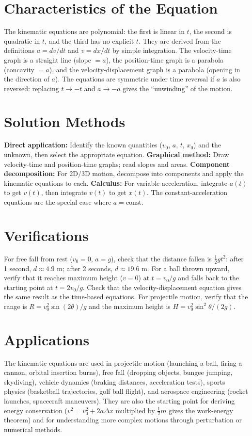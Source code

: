 \documentclass[11pt,openright]{book}
\begin{document}
\section*{Characteristics of the Equation}

The kinematic equations are polynomial: the first is linear in $t$, the second is quadratic in $t$, and the third has no explicit $t$. They are derived from the definitions $a = dv/dt$ and $v = dx/dt$ by simple integration. The velocity-time graph is a straight line (slope $= a$), the position-time graph is a parabola (concavity $= a$), and the velocity-displacement graph is a parabola (opening in the direction of $a$). The equations are symmetric under time reversal if $a$ is also reversed: replacing $t \to -t$ and $a \to -a$ gives the ``unwinding'' of the motion.
\section*{Solution Methods}

\textbf{Direct application:} Identify the known quantities ($v_0$, $a$, $t$, $x_0$) and the unknown, then select the appropriate equation. \textbf{Graphical method:} Draw velocity-time and position-time graphs; read slopes and areas. \textbf{Component decomposition:} For 2D/3D motion, decompose into components and apply the kinematic equations to each. \textbf{Calculus:} For variable acceleration, integrate $a(t)$ to get $v(t)$, then integrate $v(t)$ to get $x(t)$. The constant-acceleration equations are the special case where $a = \text{const}$.
\section*{Verifications}

For free fall from rest ($v_0 = 0$, $a = g$), check that the distance fallen is $\frac{1}{2}gt^2$: after 1 second, $d \approx 4.9$ m; after 2 seconds, $d \approx 19.6$ m. For a ball thrown upward, verify that it reaches maximum height ($v = 0$) at $t = v_0/g$ and falls back to the starting point at $t = 2v_0/g$. Check that the velocity-displacement equation gives the same result as the time-based equations. For projectile motion, verify that the range is $R = v_0^2\sin(2\theta)/g$ and the maximum height is $H = v_0^2\sin^2\theta/(2g)$.
\section*{Applications}

The kinematic equations are used in projectile motion (launching a ball, firing a cannon, orbital insertion burns), free fall (dropping objects, bungee jumping, skydiving), vehicle dynamics (braking distances, acceleration tests), sports physics (basketball trajectories, golf ball flight), and aerospace engineering (rocket launches, spacecraft maneuvers). They are also the starting point for deriving energy conservation ($v^2 = v_0^2 + 2a\Delta x$ multiplied by $\frac{1}{2}m$ gives the work-energy theorem) and for understanding more complex motions through perturbation or numerical methods.
\end{document}
